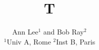 \documentclass{article}
\begin{document}
\title{T}
\author{Ann Lee$^{1}$ and Bob Ray$^{2}$\\
{\small $^1$Univ A}, Rome {\small $^2$Inst B}, Paris}
\maketitle
\end{document}
